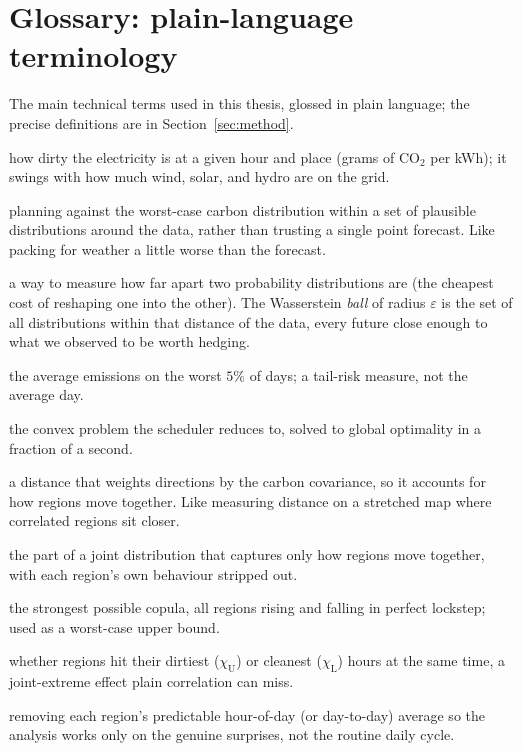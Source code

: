 \documentclass[12pt]{article}
\newcommand{\CVaR}{\mathrm{CVaR}}
\newcommand{\chiU}{\chi_{\mathrm{U}}}
\newcommand{\chiL}{\chi_{\mathrm{L}}}
\begin{document}
\section{Glossary: plain-language terminology}\label{app:glossary}
The main technical terms used in this thesis, glossed in plain language; the precise
definitions are in Section~\ref{sec:method}.
\begin{description}[leftmargin=1.4em,itemsep=1pt]
\item[Carbon intensity:] how dirty the electricity is at a given hour and place (grams of CO$_2$ per kWh); it swings with how much wind, solar, and hydro are on the grid.
\item[Distributionally robust optimization (DRO):] planning against the worst-case carbon
distribution within a set of plausible distributions around the data, rather than
trusting a single point forecast. Like packing for weather a little worse than the forecast.
\item[Wasserstein distance / ball:] a way to measure how far apart two probability distributions are (the cheapest cost of reshaping one into the other). The Wasserstein \emph{ball} of radius $\varepsilon$ is the set of all distributions within that distance of the data, every future close enough to what we observed to be worth hedging.
\item[$\CVaR_{0.95}$ (Conditional Value-at-Risk):] the average emissions on the worst
$5\%$ of days; a tail-risk measure, not the average day.
\item[Second-order cone program (SOCP):] the convex problem the scheduler reduces to,
solved to global optimality in a fraction of a second.
\item[Mahalanobis distance:] a distance that weights directions by the carbon covariance, so it accounts for how regions move together. Like measuring distance on a stretched map where correlated regions sit closer.
\item[Copula:] the part of a joint distribution that captures only how regions move together, with each region's own behaviour stripped out.
\item[Comonotone:] the strongest possible copula, all regions rising and falling in perfect lockstep; used as a worst-case upper bound.
\item[Tail dependence ($\chiU,\chiL$):] whether regions hit their dirtiest ($\chiU$) or cleanest ($\chiL$) hours at the same time, a joint-extreme effect plain correlation can miss.
\item[Residualization:] removing each region's predictable hour-of-day (or day-to-day) average so the analysis works only on the genuine surprises, not the routine daily cycle.

\end{description}
\end{document}
